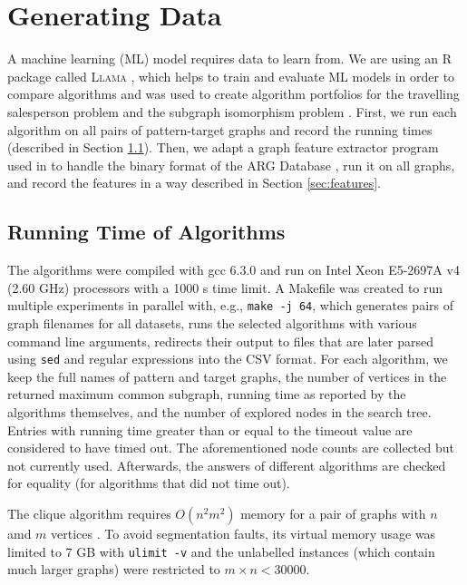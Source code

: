 \documentclass{l4proj}
\theoremstyle{definition}
\theoremstyle{remark}
\begin{document}
\chapter{Generating Data}
A machine learning (ML) model requires data to learn from. We are using an R
package called \textsc{Llama} \cite{kotthoff_llama_2013}, which helps to train
and evaluate ML models in order to compare algorithms and was used to create
algorithm portfolios for the travelling salesperson problem
\cite{DBLP:conf/lion/KotthoffKHT15} and the subgraph isomorphism problem
\cite{DBLP:conf/lion/KotthoffMS16}. First, we run each algorithm on all pairs of
pattern-target graphs and record the running times (described in Section
\ref{sec:runtimes}). Then, we adapt a graph feature extractor program used in
\cite{DBLP:conf/lion/KotthoffMS16} to handle the binary format of the ARG
Database \cite{foggia2001-2, DBLP:journals/prl/SantoFSV03}, run it on all
graphs, and record the features in a way described in Section
\ref{sec:features}.

\section{Running Time of Algorithms} \label{sec:runtimes}

The algorithms were compiled with gcc 6.3.0 and run on Intel Xeon E5-2697A v4
(2.60 GHz) processors with a \num{1000} s time limit. A Makefile was created to
run multiple experiments in parallel with, e.g., \texttt{make -j 64}, which
generates pairs of graph filenames for all datasets, runs the selected
algorithms with various command line arguments, redirects their output to files
that are later parsed using \texttt{sed} and regular expressions into the CSV
format. For each algorithm, we keep the full names of pattern and target graphs,
the number of vertices in the returned maximum common subgraph, running time as
reported by the algorithms themselves, and the number of explored nodes in the
search tree. Entries with running time greater than or equal to the timeout
value are considered to have timed out. The aforementioned node counts are
collected but not currently used. Afterwards, the answers of different
algorithms are checked for equality (for algorithms that did not time out).

The clique algorithm requires $O(n^2m^2)$ memory for a pair of graphs with $n$
amd $m$ vertices \cite{DBLP:conf/aaai/HoffmannMR17, DBLP:conf/cp/McCreeshNPS16}.
To avoid segmentation faults, its virtual memory usage was limited to 7 GB with
\texttt{ulimit -v} and the unlabelled instances (which contain much larger
graphs) were restricted to $m \times n < \num{30000}$.
\end{document}
